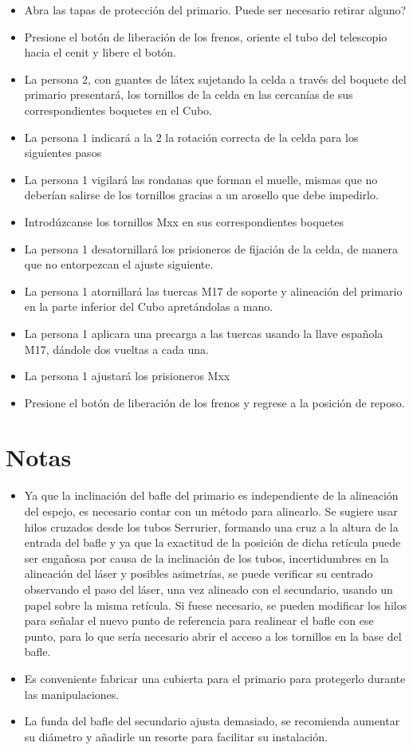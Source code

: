 \begin{itemize}
\item Abra las tapas de protección del primario. Puede ser necesario retirar alguno?
\item Presione el botón de liberación de los frenos, oriente el tubo del telescopio hacia el cenit y libere el botón. 
\item La persona 2, con guantes de látex sujetando la celda a través del boquete del primario presentará, los tornillos de la celda en las cercanías de sus correspondientes boquetes en el Cubo.
\item La persona 1 indicará a la 2 la rotación correcta de la celda para los siguientes pasos
\item La persona 1 vigilará las rondanas que forman el muelle, mismas que no deberían salirse de los tornillos gracias a un arosello que debe impedirlo.
\item Introdúzcanse los tornillos Mxx en sus correspondientes boquetes 
\item La persona 1 desatornillará los prisioneros de fijación de la celda, de manera que no entorpezcan el ajuste siguiente. 
\item La persona 1 atornillará las tuercas M17 de soporte y alineación del primario en la parte inferior del Cubo apretándolas a mano.
\item La persona 1 aplicara una precarga a las tuercas usando la llave española M17, dándole dos vueltas a cada una.
\item La persona 1 ajustará los prisioneros Mxx 
\item Presione el botón de liberación de los frenos y regrese a la posición de reposo.
\end{itemize}

\section{Notas}

\begin{itemize}
\item Ya que la inclinación del bafle del primario es independiente de la alineación del espejo, es necesario contar con un método para alinearlo. Se sugiere usar hilos cruzados desde los tubos Serrurier, formando una cruz a la altura de la entrada del bafle y ya que la exactitud de la posición de dicha retícula puede ser engañosa por causa de la inclinación de los tubos, incertidumbres en la alineación del láser y posibles asimetrías, se puede verificar su centrado observando el paso del láser, una vez alineado con el secundario, usando un papel sobre la misma retícula. Si fuese necesario, se pueden modificar los hilos para señalar el nuevo punto de referencia para realinear el bafle con ese punto, para lo que sería necesario abrir el acceso a los tornillos en la base del bafle.   
\item Es conveniente fabricar una cubierta para el primario para protegerlo durante las manipulaciones.
\item La funda del bafle del secundario ajusta demasiado, se recomienda aumentar su diámetro y añadirle un resorte para facilitar su instalación. 
\end{itemize}

